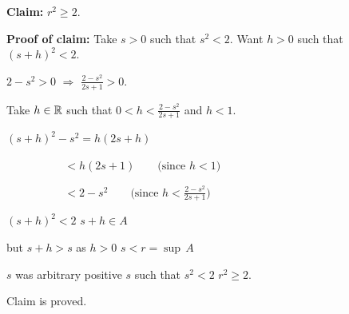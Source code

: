 \documentclass[10pt,aspectratio=169]{beamer}
\begin{document}
\begin{frame}
\textbf{Claim:} $r^2 \geq 2$.

\medskip
\pause

\textbf{Proof of claim:}
\quad
Take $s > 0$ such that $s^2 < 2$.
\quad
Want $h > 0$ such that ${(s+h)}^2 < 2$.

\medskip
\pause

$2-s^2 > 0$ \quad $\Rightarrow$ \quad $\frac{2-s^2}{2s+1} > 0$.

\medskip
\pause

Take $h \in {\mathbb{R}}$ such that $0 < h < \frac{2-s^2}{2s+1}$ and $h < 1$.

\medskip
\pause

$\displaystyle
{(s+h)}^2 - s^2 = h(2s + h)
$

\medskip
\pause

$\displaystyle
\, \quad \qquad \qquad < h(2s+1) \qquad  \bigl(\text{since } h < 1\bigr)
$

\medskip
\pause

$\displaystyle
\, \quad \qquad \qquad < 2-s^2 \qquad \bigl(\text{since } h < \tfrac{2-s^2}{2s+1} \bigr)
$

\medskip
\pause

\thus \quad ${(s+h)}^2 < 2$ \wthus $s+h \in A$

\medskip
\pause

but $s+h > s$ as $h > 0$ \wwthus $s < r = \sup\, A$

\medskip
\pause

$s$ was arbitrary positive $s$ such that $s^2 < 2$ \wwthus $r^2 \geq 2$.

\medskip
\pause

Claim is proved.
\end{frame}
\end{document}
